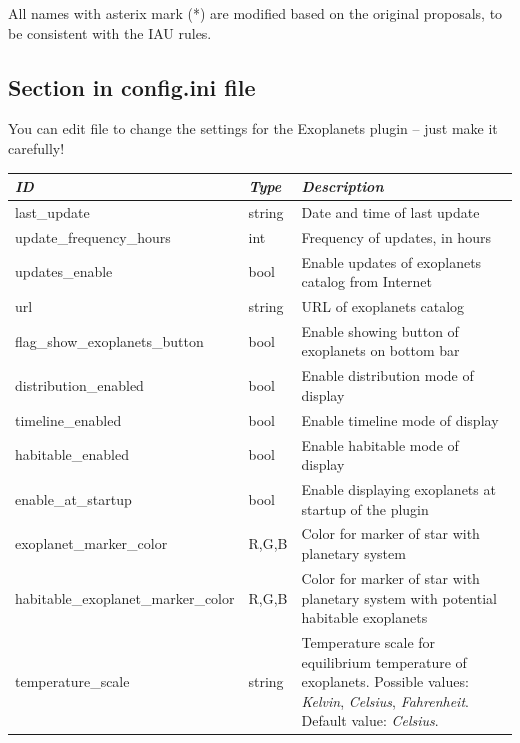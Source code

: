 All names with asterix mark (*) are modified based on the original proposals, to be consistent with the IAU rules.

\subsection{Section  in config.ini file}

You can edit  file to change the
settings for the Exoplanets plugin -- just make it carefully!

\noindent%
\begin{longtable}{l|l|p{75mm}}\toprule
\emph{ID}               & \emph{Type} & \emph{Description}\\\midrule
last\_update                 & string & Date and time of last update \\
update\_frequency\_hours       & int  & Frequency of updates, in hours \\
updates\_enable                & bool & Enable updates of exoplanets catalog from Internet \\
url                          & string & URL of exoplanets catalog \\
flag\_show\_exoplanets\_button & bool & Enable showing button of exoplanets on bottom bar \\
distribution\_enabled          & bool & Enable distribution mode of display \\
timeline\_enabled              & bool & Enable timeline mode of display \\
habitable\_enabled             & bool & Enable habitable mode of display \\
enable\_at\_startup            & bool & Enable displaying exoplanets at startup of the plugin \\
exoplanet\_marker\_color      & R,G,B & Color for marker of star with planetary system \\
habitable\_exoplanet\_marker\_color & R,G,B & Color for marker of star with planetary system with potential habitable exoplanets\\
temperature\_scale           & string & Temperature scale for equilibrium temperature of exoplanets. 
                                        Possible values: \emph{Kelvin}, \emph{Celsius}, \emph{Fahrenheit}. Default value: \emph{Celsius}. \\\bottomrule
\end{longtable}

